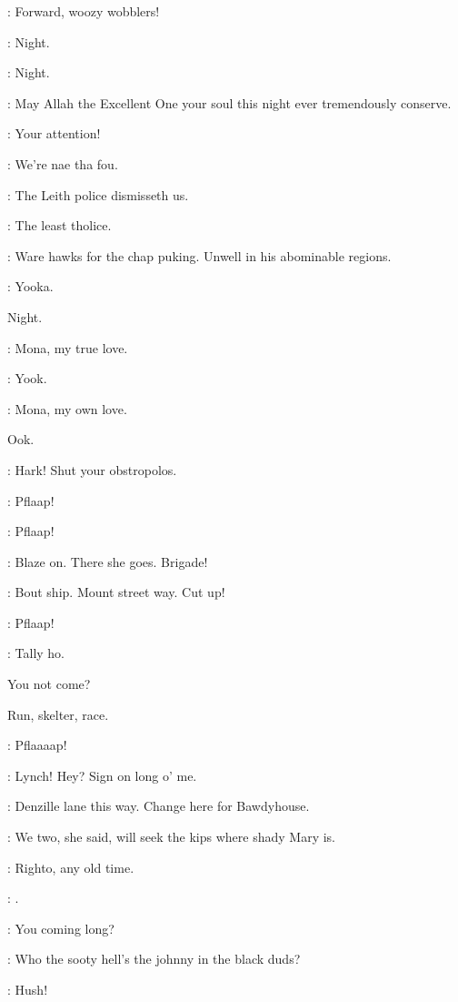 \lenehan:
Forward,
woozy wobblers!

\lynch:
Night.

\punch:
Night.

\dixon:
May Allah the Excellent One your soul this night ever
tremendously conserve.


\lenehan:
Your attention!

\crotthers:
We're nae tha fou.

\lynch:
The Leith police dismisseth us.

\lenehan:
The least tholice.

\punch:
Ware hawks for the chap puking.
Unwell in his abominable regions.

\stephen:
Yooka.

Night.

\crotthers:
Mona,
my true love.

\lynch:
Yook.

\crotthers:
Mona,
my own love.

Ook.


\lynch:
Hark!
Shut your obstropolos.

:
Pflaap!

:
Pflaap!

\lenehan:
Blaze on.
There she goes.
Brigade!

\punch:
Bout ship.
Mount street way.
Cut up!

:
Pflaap!

\lynch:
Tally ho.

You not come?

Run,
skelter,
race.

:
Pflaaaap!


\stephen:
Lynch!
Hey?
Sign on long o' me.

\lynch:
Denzille lane this way.
Change here for Bawdyhouse.

\stephen:
We two,
she said,
will seek the kips where shady Mary is.

\lynch:
Righto,
any old time.

\stephen:
.

\lynch:
You coming long?

\stephen:
Who the sooty hell's the johnny in the black duds?

\lynch:
Hush!

